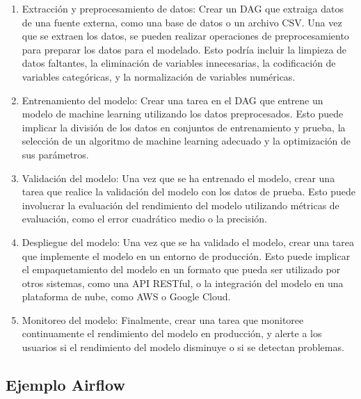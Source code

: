 \documentclass[11pt]{article}
\begin{document}
\begin{enumerate}
\item Extracción y preprocesamiento de datos: Crear un DAG que extraiga
datos de una fuente externa, como una base de datos o un archivo
CSV. Una vez que se extraen los datos, se pueden realizar
operaciones de preprocesamiento para preparar los datos para el
modelado. Esto podría incluir la limpieza de datos faltantes, la
eliminación de variables innecesarias, la codificación de
variables categóricas, y la normalización de variables numéricas.
\item Entrenamiento del modelo: Crear una tarea en el DAG que entrene un
modelo de machine learning utilizando los datos
preprocesados. Esto puede implicar la división de los datos en
conjuntos de entrenamiento y prueba, la selección de un algoritmo
de machine learning adecuado y la optimización de sus parámetros.
\item Validación del modelo: Una vez que se ha entrenado el modelo,
crear una tarea que realice la validación del modelo con los datos
de prueba. Esto puede involucrar la evaluación del rendimiento del
modelo utilizando métricas de evaluación, como el error cuadrático
medio o la precisión.
\item Despliegue del modelo: Una vez que se ha validado el modelo, crear
una tarea que implemente el modelo en un entorno de
producción. Esto puede implicar el empaquetamiento del modelo en
un formato que pueda ser utilizado por otros sistemas, como una
API RESTful, o la integración del modelo en una plataforma de
nube, como AWS o Google Cloud.
\item Monitoreo del modelo: Finalmente, crear una tarea que monitoree
continuamente el rendimiento del modelo en producción, y alerte a
los usuarios si el rendimiento del modelo disminuye o si se
detectan problemas.
\end{enumerate}

\subsection{Ejemplo Airflow}
\label{sec:org3aa5928}
\end{document}
